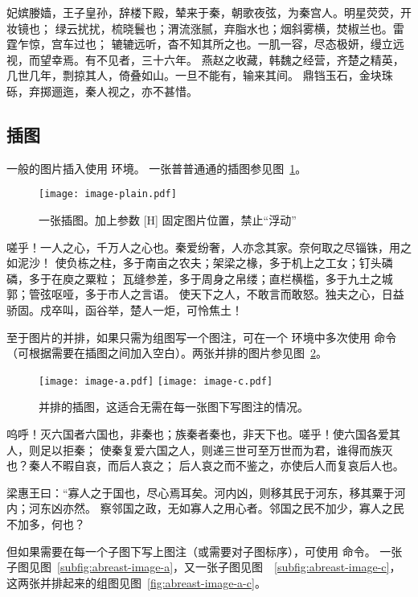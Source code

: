 妃嫔媵嫱，王子皇孙，辞楼下殿，辇来于秦，朝歌夜弦，为秦宫人。明星荧荧，开妆镜也；
绿云扰扰，梳晓鬟也；渭流涨腻，弃脂水也；烟斜雾横，焚椒兰也。雷霆乍惊，宫车过也；
辘辘远听，杳不知其所之也。一肌一容，尽态极妍，缦立远视，而望幸焉。有不见者，三十六年。
燕赵之收藏，韩魏之经营，齐楚之精英，几世几年，剽掠其人，倚叠如山。一旦不能有，输来其间。
鼎铛玉石，金块珠砾，弃掷逦迤，秦人视之，亦不甚惜。

\subsection{插图}\label{subsec:fig}

一般的图片插入使用  环境。
一张普普通通的插图参见图~\ref{fig:a-single-image}。

\begin{figure}[H]
	\centering
	\texttt{[image: image-plain.pdf]}
	\caption{一张插图。加上参数 [H] 固定图片位置，禁止“浮动”}\label{fig:a-single-image}
\end{figure}

嗟乎！一人之心，千万人之心也。秦爱纷奢，人亦念其家。奈何取之尽锱铢，用之如泥沙！
使负栋之柱，多于南亩之农夫；架梁之椽，多于机上之工女；钉头磷磷，多于在庾之粟粒；
瓦缝参差，多于周身之帛缕；直栏横槛，多于九土之城郭；管弦呕哑，多于市人之言语。
使天下之人，不敢言而敢怒。独夫之心，日益骄固。戍卒叫，函谷举，楚人一炬，可怜焦土！

至于图片的并排，如果只需为组图写一个图注，可在一个  环境中多次使用  命令（可根据需要在插图之间加入空白）。两张并排的图片参见图~\ref{fig:abreast-image}。

\begin{figure}[htbp]
	\centering
	\texttt{[image: image-a.pdf]}
	\hspace{1cm}
	\texttt{[image: image-c.pdf]}
	\caption{并排的插图，这适合无需在每一张图下写图注的情况。}\label{fig:abreast-image}
\end{figure}

呜呼！灭六国者六国也，非秦也；族秦者秦也，非天下也。嗟乎！使六国各爱其人，则足以拒秦；
使秦复爱六国之人，则递三世可至万世而为君，谁得而族灭也？秦人不暇自哀，而后人哀之；
后人哀之而不鉴之，亦使后人而复哀后人也。

梁惠王曰：“寡人之于国也，尽心焉耳矣。河内凶，则移其民于河东，移其粟于河内；河东凶亦然。
察邻国之政，无如寡人之用心者。邻国之民不加少，寡人之民不加多，何也？

但如果需要在每一个子图下写上图注（或需要对子图标序），可使用  命令。
一张子图见图~\ref{subfig:abreast-image-a}，又一张子图见图~~\ref{subfig:abreast-image-c}，这两张并排起来的组图见图~\ref{fig:abreast-image-a-c}。

